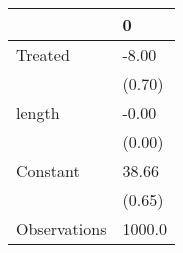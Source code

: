 \begin{tabular}{ll}
\toprule
{} &       0 \\
\midrule
Treated      &   -8.00 \\
             &  (0.70) \\
length       &   -0.00 \\
             &  (0.00) \\
Constant     &   38.66 \\
             &  (0.65) \\
Observations &  1000.0 \\
\bottomrule
\end{tabular}
